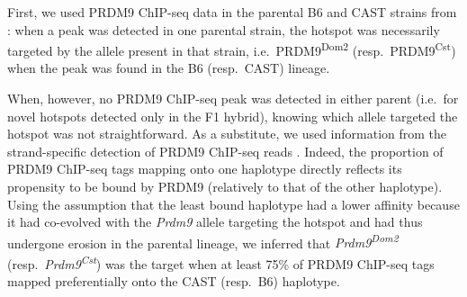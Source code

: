 First, we used PRDM9 ChIP-seq data in the parental B6 and CAST strains from \citet{baker2015prdm9}: 
when a peak was detected in one parental strain, the hotspot was necessarily targeted by the allele present in that strain, i.e.\ PRDM9\textsuperscript{Dom2} (resp.\ PRDM9\textsuperscript{Cst}) when the peak was found in the B6 (resp.\ CAST) lineage.

%

When, however, no PRDM9 ChIP-seq peak was detected in either parent (i.e.\ for novel hotspots detected only in the F1 hybrid), knowing which allele targeted the hotspot was not straightforward.
As a substitute, we used information from the strand-specific detection of PRDM9 ChIP-seq reads \citep{baker2015prdm9}.
Indeed, the proportion of PRDM9 ChIP-seq tags mapping onto one haplotype directly reflects its propensity to be bound by PRDM9 (relatively to that of the other haplotype).
Using the assumption that the least bound haplotype had a lower affinity because it had co-evolved with the \textit{Prdm9} allele targeting the hotspot and had thus undergone erosion in the parental lineage, we inferred that \textit{Prdm9\textsuperscript{Dom2}} (resp.\ \textit{Prdm9\textsuperscript{Cst}}) was the target when at least 75\% of PRDM9 ChIP-seq tags mapped preferentially onto the CAST (resp.\ B6) haplotype.


